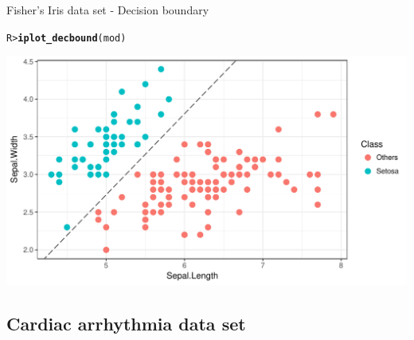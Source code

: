 \documentclass{beamer}\usepackage[]{graphicx}\usepackage[]{color}
\makeatletter
\def\maxwidth{ %
  \ifdim\Gin@nat@width>\linewidth
    \linewidth
  \else
    \Gin@nat@width
  \fi
}
\newcommand{\hlstd}[1]{\textcolor[rgb]{0.345,0.345,0.345}{#1}}%
\newcommand{\hlkwd}[1]{\textcolor[rgb]{0.737,0.353,0.396}{\textbf{#1}}}%
\newenvironment{kframe}{%
 \def\at@end@of@kframe{}%
 \ifinner\ifhmode%
  \def\at@end@of@kframe{\end{minipage}}%
  \begin{minipage}{\columnwidth}%
 \fi\fi%
 \def\FrameCommand##1{\hskip\@totalleftmargin \hskip-\fboxsep
 \colorbox{shadecolor}{##1}\hskip-\fboxsep
     \hskip-\linewidth \hskip-\@totalleftmargin \hskip\columnwidth}%
 \MakeFramed {\advance\hsize-\width
   \@totalleftmargin\z@ \linewidth\hsize
   \@setminipage}}%
 {\par\unskip\endMakeFramed%
 \at@end@of@kframe}
\newenvironment{knitrout}{}{} %
\makeatother
\begin{document}
\begin{frame}[fragile]{Fisher's Iris data set - Decision boundary}
\vspace{-5pt}
\begin{knitrout}\small
{}\color{fgcolor}\begin{kframe}
\begin{alltt}
\hlstd{R> }\hlkwd{iplot_decbound}\hlstd{(mod)}
\end{alltt}
\end{kframe}

{\centering \includegraphics[width=\maxwidth]{figure/iris-decbound-1} 

}



\end{knitrout}
\end{frame}

\subsection{Cardiac arrhythmia data set}
\end{document}
